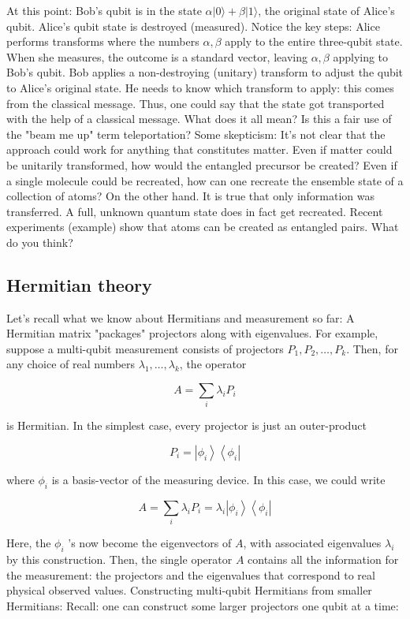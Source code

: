 \documentclass[main.tex]{subfiles}
\begin{document}
    At this point: Bob's qubit is in the state $\alpha|0\rangle+\beta|1\rangle$, the original state of Alice's qubit. Alice's qubit state is destroyed (measured). Notice the key steps: Alice performs transforms where the numbers $\alpha, \beta$ apply to the entire three-qubit state. When she measures, the outcome is a standard vector, leaving $\alpha, \beta$ applying to Bob's qubit. Bob applies a non-destroying (unitary) transform to adjust the qubit to Alice's original state. He needs to know which transform to apply: this comes from the classical message. Thus, one could say that the state got transported with the help of a classical message. What does it all mean? Is this a fair use of the "beam me up" term teleportation? Some skepticism: It's not clear that the approach could work for anything that constitutes matter. Even if matter could be unitarily transformed, how would the entangled precursor be created? Even if a single molecule could be recreated, how can one recreate the ensemble state of a collection of atoms? On the other hand. It is true that only information was transferred. A full, unknown quantum state does in fact get recreated. Recent experiments (example) show that atoms can be created as entangled pairs. What do you think?

\subsection{Hermitian theory}

    Let's recall what we know about Hermitians and measurement so far: A Hermitian matrix "packages" projectors along with eigenvalues. For example, suppose a multi-qubit measurement consists of projectors $P_{1}, P_{2}, \ldots, P_{k}$. Then, for any choice of real numbers $\lambda_{1}, \ldots, \lambda_{k}$, the operator
    
    $$
    A=\sum_{i} \lambda_{i} P_{i}
    $$
    
    is Hermitian. In the simplest case, every projector is just an outer-product
    
    $$
    P_{i}=\left|\phi_{i}\right\rangle\left\langle\phi_{i}\right|
    $$
    
    where $\phi_{i}$ is a basis-vector of the measuring device. In this case, we could write
    
    $$
    A=\sum_{i} \lambda_{i} P_{i}=\lambda_{i}\left|\phi_{i}\right\rangle\left\langle\phi_{i}\right|
    $$
    
    Here, the $\phi_{i}$ 's now become the eigenvectors of $A$, with associated eigenvalues $\lambda_{i}$ by this construction. Then, the single operator $A$ contains all the information for the measurement: the projectors and the eigenvalues that correspond to real physical observed values. Constructing multi-qubit Hermitians from smaller Hermitians: Recall: one can construct some larger projectors one qubit at a time:
    
\end{document}
